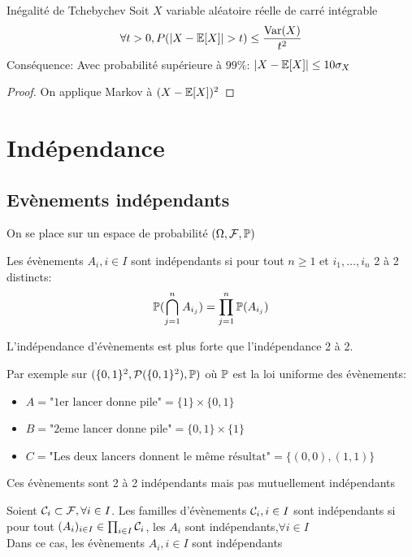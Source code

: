 \documentclass[]{report}
\begin{document}
    \begin{tm}{Inégalité de Tchebychev}{}
        Soit $X$ variable aléatoire réelle de carré intégrable
        \[\forall t>0,P(|X-\Ea[X]|>t)\le\frac{\Var(X)}{t^2}\]
        Conséquence: Avec probabilité supérieure à $99\%$: $|X-\mathbb{E}[X]|\le 10\sigma_X$
    \end{tm}

    \begin{proof}
        On applique Markov à $(X-\mathbb{E}[X])^2$
    \end{proof}

    \chapter{Indépendance}

    \section{Evènements indépendants}

    On se place sur un espace de probabilité $(\Omega,\mathcal{F},\mathbb{P})$

    \begin{df}{}{}
        Les évènements $A_i,i\in I$ sont indépendants si pour tout $n\ge 1$ et $i_1,\ldots,i_n$ 2 à 2 distincts:
        \[\mathbb{P}(\bigcap_{j=1}^nA_{i_j})=\prod_{j=1}^{n}\mathbb{P}(A_{i_j})\]
    \end{df}

    \begin{re}{}{}
        L'indépendance d'évènements est plus forte que l'indépendance 2 à 2.
    \end{re}

    \begin{ex}{}{}
        Par exemple sur $(\{0,1\}^2,\mathcal{P}(\{0,1\}^2),\mathbb{P})$ où $\mathbb{P}$ est la loi uniforme des évènements:
        \begin{itemize}
            \item $A=\text{"1er lancer donne pile"}=\{1\}\times\{0,1\}$
            \item $B=\text{"2eme lancer donne pile"}=\{0,1\}\times\{1\}$
            \item $C=\text{"Les deux lancers donnent le même résultat"}=\{(0,0),(1,1)\}$
        \end{itemize}
        Ces évènements sont 2 à 2 indépendants mais pas mutuellement indépendants
    \end{ex}

    \begin{df}{}{}
        Soient $\mathcal{C}_i\subset \mathcal{F},\forall i\in I$. Les familles d'évènements $\mathcal{C}_i,i\in I$ sont indépendants si pour tout $(A_i)_{i\in I}\in\prod_{i\in I} \mathcal{C}_i$, les $A_i$ sont indépendants,$\forall i\in I$\\
        Dans ce cas, les évènements $A_i,i\in I$ sont indépendants
    \end{df}
\end{document}
